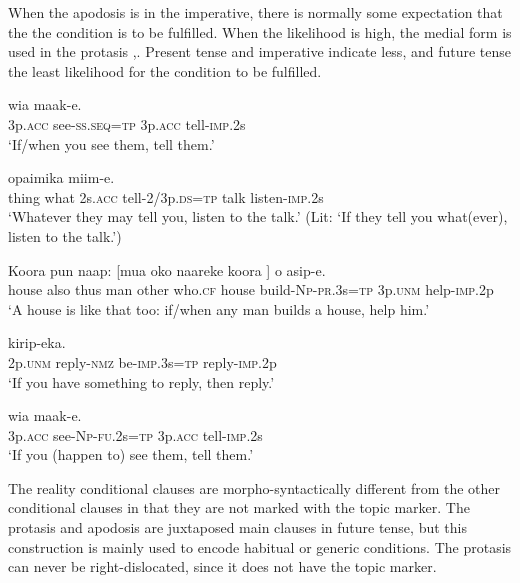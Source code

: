 When the apodosis is in the imperative, there is normally some expectation that the the condition is to be fulfilled. When the likelihood is high, the medial form is used in the protasis ,. Present tense  and imperative  indicate less, and future tense  the least likelihood for the condition to be fulfilled.

\ea%
\label{ex:8:x1650}
\gll [Wia  \textstyleEmphasizedVernacularWords{uruf-ap=na}]  wia  maak-e.\\
3p.\textsc{acc} see-\textsc{ss}.\textsc{seq}=\textsc{tp} 3p.\textsc{acc} tell-\textsc{imp}.2s\\
\glt`If/when you see them, tell them.'
\z


\ea%
\label{ex:8:x1649}
\gll [Maa  mauwa  nefa  \textstyleEmphasizedVernacularWords{maak-iwkin=na}]  opaimika  miim-e.\\
thing  what 2s.\textsc{acc} tell-2/3p.\textsc{ds}=\textsc{tp} talk  listen-\textsc{imp}.2s\\
\glt`Whatever they may tell you, listen to the talk.' (Lit: `If they tell you what(ever), listen to the talk.')
\z


\ea%
\label{ex:8:x1651}
\gll Koora  pun  naap:  [mua  oko  naareke  koora  ] o  asip-e.\\
house  also  thus  man  other  who.\textsc{cf} house  build-\textsc{Np}-\textsc{pr}.3s=\textsc{tp} 3p.\textsc{unm} help-\textsc{imp}.2p\\
\glt`A house is like that too: if/when any man builds a house, help him.'
\z


\ea%
\label{ex:8:x1656}
\gll [Ni  kirip-owa  \textstyleEmphasizedVernacularWords{ika-inok}=\textstyleEmphasizedVernacularWords{na}] kirip-eka.\\
2p.\textsc{unm} reply-\textsc{nmz} be-\textsc{imp}.3s=\textsc{tp} reply-\textsc{imp}.2p\\
\glt`If you have something to reply, then reply.'
\z


\ea%
\label{ex:8:x1657}
\gll [Wia  \textstyleEmphasizedVernacularWords{uruf-i-nan=na}] wia  maak-e.\\
3p.\textsc{acc} see-\textsc{Np}-\textsc{fu}.2s=\textsc{tp} 3p.\textsc{acc} tell-\textsc{imp}.2s\\
\glt`If you (happen to) see them, tell them.'
\z


The reality conditional clauses are morpho-syntactically different from the other conditional clauses in that they are not marked with the topic marker. The protasis and apodosis are juxtaposed main clauses in future tense, but this construction is mainly used to encode habitual or generic conditions. The protasis can never be right-dislocated, since it does not have the topic marker. 

